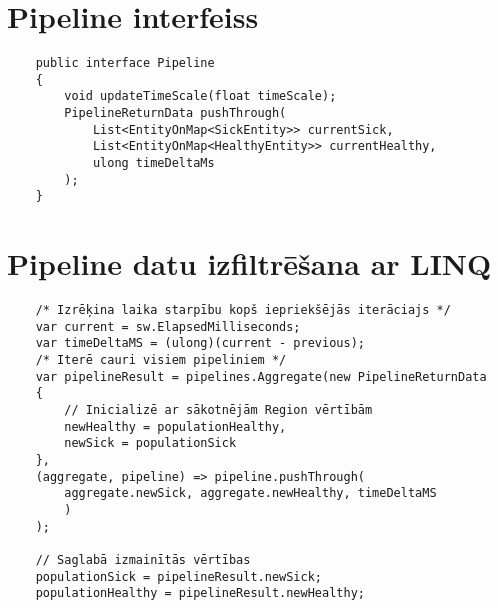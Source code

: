 \section{Pipeline interfeiss}
\label{app:IPipeline}
{
\begin{verbatim}
    public interface Pipeline
    {
        void updateTimeScale(float timeScale);
        PipelineReturnData pushThrough(
            List<EntityOnMap<SickEntity>> currentSick,
            List<EntityOnMap<HealthyEntity>> currentHealthy,
            ulong timeDeltaMs
        );
    }
\end{verbatim}
}

\section{Pipeline datu izfiltrēšana ar LINQ}
\label{app:pipelien-linq}
{
\begin{verbatim}
    /* Izrēķina laika starpību kopš iepriekšējās iterāciajs */
    var current = sw.ElapsedMilliseconds;
    var timeDeltaMS = (ulong)(current - previous);
    /* Iterē cauri visiem pipeliniem */
    var pipelineResult = pipelines.Aggregate(new PipelineReturnData
    {
        // Inicializē ar sākotnējām Region vērtībām
        newHealthy = populationHealthy,
        newSick = populationSick
    },
    (aggregate, pipeline) => pipeline.pushThrough(
        aggregate.newSick, aggregate.newHealthy, timeDeltaMS
        )
    );

    // Saglabā izmainītās vērtības
    populationSick = pipelineResult.newSick;
    populationHealthy = pipelineResult.newHealthy;
\end{verbatim}
}
